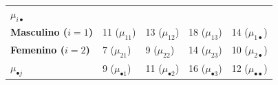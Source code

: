 \documentclass[]{book}
\theoremstyle{definition}
\theoremstyle{definition}
\theoremstyle{definition}
\theoremstyle{remark}
\begin{document}
\begin{longtable}[]{@{}lllll@{}}
\begin{minipage}[t]{0.20\columnwidth}
\textbf{\(\mu_{i\bullet}\)}\strut
\end{minipage}\tabularnewline
\begin{minipage}[t]{0.15\columnwidth}\raggedright
\textbf{Masculino (\(i = 1\))}\strut
\end{minipage} & \begin{minipage}[t]{0.17\columnwidth}\raggedright
11 (\(\mu_{11}\))\strut
\end{minipage} & \begin{minipage}[t]{0.17\columnwidth}\raggedright
13 (\(\mu_{12}\))\strut
\end{minipage} & \begin{minipage}[t]{0.16\columnwidth}\raggedright
18 (\(\mu_{13}\))\strut
\end{minipage} & \begin{minipage}[t]{0.20\columnwidth}\raggedright
14 (\(\mu_{1 \bullet}\))\strut
\end{minipage}\tabularnewline
\begin{minipage}[t]{0.15\columnwidth}\raggedright
\textbf{Femenino (\(i = 2\))}\strut
\end{minipage} & \begin{minipage}[t]{0.17\columnwidth}\raggedright
7 (\(\mu_{21}\))\strut
\end{minipage} & \begin{minipage}[t]{0.17\columnwidth}\raggedright
9 (\(\mu_{22}\))\strut
\end{minipage} & \begin{minipage}[t]{0.16\columnwidth}\raggedright
14 (\(\mu_{23}\))\strut
\end{minipage} & \begin{minipage}[t]{0.20\columnwidth}\raggedright
10 (\(\mu_{2 \bullet}\))\strut
\end{minipage}\tabularnewline
\begin{minipage}[t]{0.15\columnwidth}\raggedright
\textbf{\(\mu_{\bullet j}\)}\strut
\end{minipage} & \begin{minipage}[t]{0.17\columnwidth}\raggedright
9 (\(\mu_{\bullet 1}\))\strut
\end{minipage} & \begin{minipage}[t]{0.17\columnwidth}\raggedright
11 (\(\mu_{\bullet 2}\))\strut
\end{minipage} & \begin{minipage}[t]{0.16\columnwidth}\raggedright
16 (\(\mu_{\bullet 3}\))\strut
\end{minipage} & \begin{minipage}[t]{0.20\columnwidth}\raggedright
12 (\(\mu_{\bullet \bullet}\))\strut
\end{minipage}\tabularnewline
\bottomrule
\end{longtable}
\end{document}
